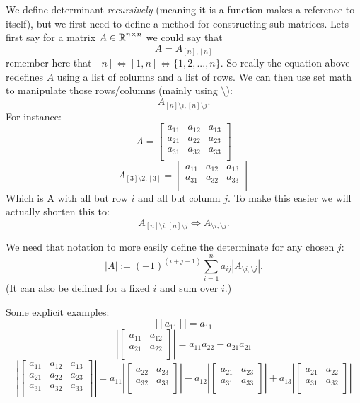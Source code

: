 We define determinant \emph{recursively} (meaning it is a function makes a reference to itself), 
but we first need to define a method for constructing sub-matrices. 
Lets first say for a matrix $A\in\operatorname{\mathbb{R}}^{n\times n}$ we could say that 
\[A = A_{[n],[n]}\] 
remember here that $[n] \iff [1,n] \iff \{1,2,...,n\}$. 
So really the equation above redefines $A$ using a list of columns and a list of rows. 
We can then use set math to manipulate those rows/columns (mainly using $\setminus$): 
\[A_{[n]\setminus i,[n]\setminus j}.\]
For instance: 
\[A = \left[\begin{matrix}a_{11} & a_{12} & a_{13}\\ a_{21} & a_{22} & a_{23}\\ a_{31} & a_{32} & a_{33}\\\end{matrix}\right]\]
\[A_{[3]\setminus 2,[3]} = \left[\begin{matrix}a_{11} & a_{12} & a_{13}\\ a_{31} & a_{32} & a_{33}\\\end{matrix}\right]\]
Which is A with all but row $i$ and all but column $j$. 
To make this easier we will actually shorten this to: 
\[A_{[n]\setminus i,[n]\setminus j} \iff A_{\setminus i,\setminus j}.\]

We need that notation to more easily define the determinate for any chosen $j$:
\[
|A| := (-1)^{(i+j-1)} \sum_{i=1}^n a_{ij} \left|A_{\setminus i,\setminus j}\right|.
\]
(It can also be defined for a fixed $i$ and sum over $i$.)

Some explicit examples:
\[\left|\left[a_{11}\right]\right| = a_{11}\]
\[\left|\left[\begin{matrix}a_{11} & a_{12}\\ a_{21} & a_{22}\\\end{matrix}\right]\right| = a_{11}a_{22}-a_{21}a_{21}\]
\[\left|\left[\begin{matrix}a_{11} & a_{12} & a_{13}\\ a_{21} & a_{22} & a_{23}\\ a_{31} & a_{32} & a_{33}\\\end{matrix}\right]\right| = a_{11}\left|\left[\begin{matrix}a_{22} & a_{23}\\ a_{32} & a_{33}\\\end{matrix}\right]\right|-a_{12}\left|\left[\begin{matrix}a_{21} & a_{23}\\ a_{31} & a_{33}\\\end{matrix}\right]\right|+a_{13}\left|\left[\begin{matrix}a_{21} & a_{22}\\ a_{31} & a_{32}\\\end{matrix}\right]\right|\]


